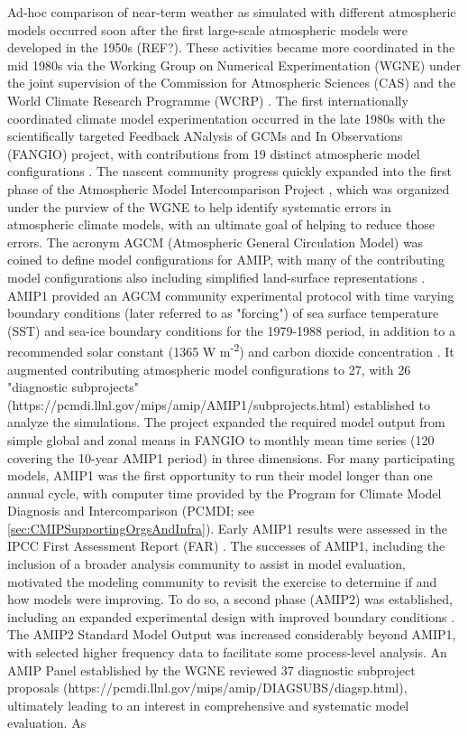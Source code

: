 \documentclass[gmd, preprint]{copernicus}
\begin{document}
Ad-hoc comparison of near-term weather as simulated with different atmospheric models occurred soon after the first large-scale atmospheric models were developed in the 1950s (REF?).  These activities became more coordinated in the mid 1980s via the Working Group on Numerical Experimentation (WGNE) under the joint supervision of the Commission for Atmospheric Sciences (CAS) and the World Climate Research Programme (WCRP) \citep{gates_ams_1992}. The first internationally coordinated climate model experimentation occurred in the late 1980s with the scientifically targeted Feedback ANalysis of GCMs and In Observations (FANGIO) project, with contributions from 19 distinct atmospheric model configurations \citep{cess_methodology_1988, cess_interpretation_1989, cess_intercomparison_1990, cess_first_1991}. The nascent community progress quickly expanded into the first phase of the Atmospheric Model Intercomparison Project \citep[AMIP, hereafter referred to as AMIP1;][]{gates_amip_1992}, which was organized under the purview of the WGNE to help identify systematic errors in atmospheric climate models, with an ultimate goal of helping to reduce those errors. The acronym AGCM (Atmospheric General Circulation Model) was coined to define model configurations for AMIP, with many of the contributing model configurations also including simplified land-surface representations \citep[e.g.,][]{budyko_heat_1961,manabe_climate_1969,vargas_godoy_global_2021}. AMIP1 provided an AGCM community experimental protocol with time varying boundary conditions (later referred to as "forcing") of sea surface temperature (SST) and sea-ice boundary conditions for the 1979-1988 period, in addition to a recommended solar constant (1365 W m\textsuperscript{-2}) and carbon dioxide concentration \citep[345 ppm;][]{gates_amip_1991}. It augmented contributing atmospheric model configurations to 27, with 26 "diagnostic subprojects" (https://pcmdi.llnl.gov/mips/amip/AMIP1/subprojects.html) established to analyze the simulations. The project expanded the required model output from simple global and zonal means in FANGIO to monthly mean time series (120 covering the 10-year AMIP1 period) in three dimensions. For many participating models, AMIP1 was the first opportunity to run their model longer than one annual cycle, with computer time provided by the Program for Climate Model Diagnosis and Intercomparison (PCMDI; see \autoref{sec:CMIPSupportingOrgsAndInfra}). Early AMIP1 results were assessed in the IPCC First Assessment Report (FAR) \citep{gates_validation_1990}. The successes of AMIP1, including the inclusion of a broader analysis community to assist in model evaluation, motivated the modeling community to revisit the exercise to determine if and how models were improving. To do so, a second phase (AMIP2) was established, including an expanded experimental design with improved boundary conditions \citep{liang_pcmdi_1997, taylor_pcmdi_2000}. The AMIP2 Standard Model Output was increased considerably beyond AMIP1, with selected higher frequency data to facilitate some process-level analysis. An AMIP Panel established by the WGNE reviewed 37 diagnostic subproject proposals (https://pcmdi.llnl.gov/mips/amip/DIAGSUBS/diagsp.html), ultimately leading to an interest in comprehensive and systematic model evaluation. As 
\end{document}

